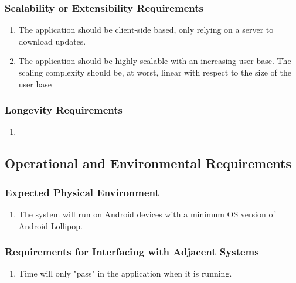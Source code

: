 \documentclass[]{article}
\begin{document}
\subsubsection{Scalability or Extensibility Requirements}
\label{ssub:scalability_or_extensibility_requirements}
\begin{enumerate}[{PR}1. ]
	\item The application should be client-side based, only relying on a server to download updates.
	\item The application should be highly scalable with an increasing user base. The scaling complexity should be, at worst, linear with respect to the size of the user base
\end{enumerate}

\subsubsection{Longevity Requirements}
\label{ssub:longevity_requirements}
\begin{enumerate}[{PR}1. ]
	\item 
\end{enumerate}


\subsection{Operational and Environmental Requirements}
\label{sub:operational_and_environmental_requirements}

\subsubsection{Expected Physical Environment}
\label{ssub:expected_physical_environment}
\begin{enumerate}[{OE}1. ]
	\item The system will run on Android devices with a minimum OS version of Android Lollipop.

\end{enumerate}

\subsubsection{Requirements for Interfacing with Adjacent Systems}
\label{ssub:requirements_for_interfacing_with_adjacent_systems}
\begin{enumerate}[{OE}1. ]
	\item Time will only "pass" in the application when it is running.
\end{enumerate}
\end{document}
